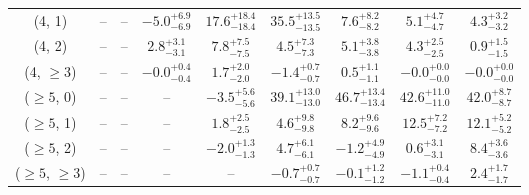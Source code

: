\begin{table}[h!]
{\begin{tabular}{ccccccccc}
	(4, 1) & -- & -- & $-5.0^{+ 6.9 }_{- 6.9 }$ & $17.6^{+ 18.4 }_{- 18.4 }$ & $35.5^{+ 13.5 }_{- 13.5 }$ & $7.6^{+ 8.2 }_{- 8.2 }$ & $5.1^{+ 4.7 }_{- 4.7 }$ & $4.3^{+ 3.2 }_{- 3.2 }$ \\[0.5ex] 
	(4, 2) & -- & -- & $2.8^{+ 3.1 }_{- 3.1 }$ & $7.8^{+ 7.5 }_{- 7.5 }$ & $4.5^{+ 7.3 }_{- 7.3 }$ & $5.1^{+ 3.8 }_{- 3.8 }$ & $4.3^{+ 2.5 }_{- 2.5 }$ & $0.9^{+ 1.5 }_{- 1.5 }$ \\[0.5ex] 
	(4, $\ge3$) & -- & -- & $-0.0^{+ 0.4 }_{- 0.4 }$ & $1.7^{+ 2.0 }_{- 2.0 }$ & $-1.4^{+ 0.7 }_{- 0.7 }$ & $0.5^{+ 1.1 }_{- 1.1 }$ & $-0.0^{+ 0.0 }_{- 0.0 }$ & $-0.0^{+ 0.0 }_{- 0.0 }$ \\[0.5ex] 
	($\ge5$, 0) & -- & -- & -- & $-3.5^{+ 5.6 }_{- 5.6 }$ & $39.1^{+ 13.0 }_{- 13.0 }$ & $46.7^{+ 13.4 }_{- 13.4 }$ & $42.6^{+ 11.0 }_{- 11.0 }$ & $42.0^{+ 8.7 }_{- 8.7 }$ \\[0.5ex] 
	($\ge5$, 1) & -- & -- & -- & $1.8^{+ 2.5 }_{- 2.5 }$ & $4.6^{+ 9.8 }_{- 9.8 }$ & $8.2^{+ 9.6 }_{- 9.6 }$ & $12.5^{+ 7.2 }_{- 7.2 }$ & $12.1^{+ 5.2 }_{- 5.2 }$ \\[0.5ex] 
	($\ge5$, 2) & -- & -- & -- & $-2.0^{+ 1.3 }_{- 1.3 }$ & $4.7^{+ 6.1 }_{- 6.1 }$ & $-1.2^{+ 4.9 }_{- 4.9 }$ & $0.6^{+ 3.1 }_{- 3.1 }$ & $8.4^{+ 3.6 }_{- 3.6 }$ \\[0.5ex] 
	($\ge5$, $\ge3$) & -- & -- & -- & -- & $-0.7^{+ 0.7 }_{- 0.7 }$ & $-0.1^{+ 1.2 }_{- 1.2 }$ & $-1.1^{+ 0.4 }_{- 0.4 }$ & $2.4^{+ 1.7 }_{- 1.7 }$ \\[0.5ex] 
	\hline
	\hline
\end{tabular}}
\end{table}
